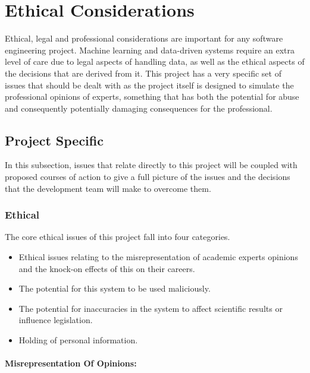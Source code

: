\documentclass{ecmm427_assignment}
\begin{document}
\section{Ethical Considerations}

\quad Ethical, legal and professional considerations are important for any
software engineering project. Machine learning and data-driven systems
require an extra level of care due to legal aspects of handling data,
as well as the ethical aspects of the decisions that are derived from
it. This project has a very specific set of issues that should be
dealt with as the project itself is designed to simulate the professional
opinions of experts, something that has both the potential for abuse
and consequently potentially damaging consequences for the professional.

\subsection{Project Specific}

\quad In this subsection, issues that relate directly to this project will
be coupled with proposed courses of action to give a full picture
of the issues and the decisions that the development team will make
to overcome them. 

\subsubsection{Ethical}

The core ethical issues of this project fall into four categories. 
\begin{itemize}
\item Ethical issues relating to the misrepresentation of academic experts
opinions and the knock-on effects of this on their careers.
\item The potential for this system to be used maliciously.
\item The potential for inaccuracies in the system to affect scientific
results or influence legislation. 
\item Holding of personal information.
\end{itemize}

\paragraph{Misrepresentation Of Opinions:}
\end{document}
